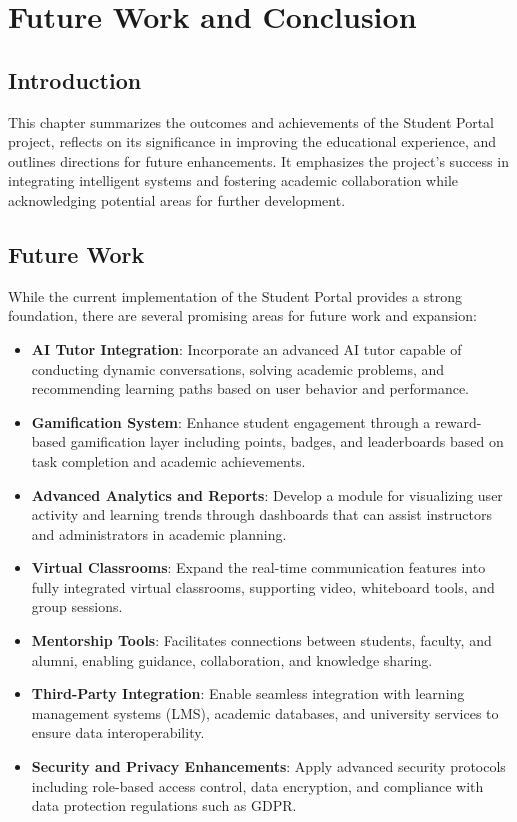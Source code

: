 \chapter{Future Work and Conclusion}

\section{Introduction}

This chapter summarizes the outcomes and achievements of the Student Portal project, reflects on its significance in improving the educational experience, and outlines directions for future enhancements. It emphasizes the project's success in integrating intelligent systems and fostering academic collaboration while acknowledging potential areas for further development.

\section{Future Work}

While the current implementation of the Student Portal provides a strong foundation, there are several promising areas for future work and expansion:

\begin{itemize}
  \item \textbf{AI Tutor Integration}: Incorporate an advanced AI tutor capable of conducting dynamic conversations, solving academic problems, and recommending learning paths based on user behavior and performance.

  \item \textbf{Gamification System}: Enhance student engagement through a reward-based gamification layer including points, badges, and leaderboards based on task completion and academic achievements.

  \item \textbf{Advanced Analytics and Reports}: Develop a module for visualizing user activity and learning trends through dashboards that can assist instructors and administrators in academic planning.

  \item \textbf{Virtual Classrooms}: Expand the real-time communication features into fully integrated virtual classrooms, supporting video, whiteboard tools, and group sessions.

  \item \textbf{Mentorship Tools}: Facilitates connections between students, faculty, and alumni, enabling guidance, collaboration, and knowledge sharing.

  \item \textbf{Third-Party Integration}: Enable seamless integration with learning management systems (LMS), academic databases, and university services to ensure data interoperability.

  \item \textbf{Security and Privacy Enhancements}: Apply advanced security protocols including role-based access control, data encryption, and compliance with data protection regulations such as GDPR.
  
\end{itemize}

